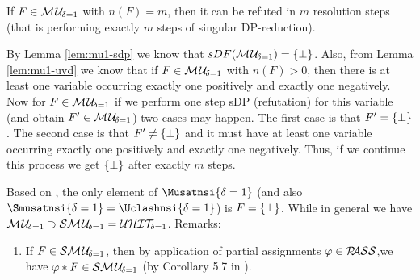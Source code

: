 \documentclass{report}
\begin{document}
\begin{lem}\label{lem:mu1-refu-tree}
If $F \in \mathcal{M\hspace{0.8pt}U}_{\!\delta=1}$ with $n(F)=m$, then it can be refuted in $m$ resolution steps (that is performing exactly $m$ steps of singular DP-reduction).
\end{lem}
\begin{prf}
By Lemma \ref{lem:mu1-sdp} we know that $sDF(\mathcal{M\hspace{0.8pt}U}_{\!\delta=1})=\{ \bot \}$. Also, from Lemma \ref{lem:mu1-uvd} we know that if $F \in \mathcal{M\hspace{0.8pt}U}_{\!\delta=1}$ with $n(F) > 0$, then there is at least one variable occurring exactly one positively and exactly one negatively. Now for $F \in \mathcal{M\hspace{0.8pt}U}_{\!\delta=1}$ if we perform one step sDP (refutation) for this variable (and obtain $F' \in \mathcal{M\hspace{0.8pt}U}_{\!\delta=1}$) two cases may happen. The first case is that $F' =\{ \bot \}$. The second case is that $F' \not = \{ \bot \}$ and it must have at least one variable occurring exactly one positively and exactly one negatively. Thus, if we continue this process we get $\{ \bot \}$ after exactly $m$ steps. 
\end{prf}

\begin{lem}\label{lem:mu1-sma-uhit}
Based on \cite{KullmannZhao2010Extremal}, the only element of $\Musatnsi{\delta=1}$ (and also $\Smusatnsi{\delta=1} = \Uclashnsi{\delta=1}$) is $F=\{ \bot \}$. While in general we have $\mathcal{M\hspace{0.8pt}U}_{\!\delta=1} \supset \mathcal{S}\mathcal{M\hspace{0.8pt}U}_{\!\delta=1} = \mathcal{U}\mathcal{HIT}_{\!\!\delta=1}$.
Remarks:
  \begin{enumerate}
  \item If $F \in \mathcal{S}\mathcal{M\hspace{0.8pt}U}_{\!\delta=1}$, then by application of partial assignments $\varphi \in \mathcal{P\hspace{-0.32em}ASS}$,we have $\varphi * F \in \mathcal{S}\mathcal{M\hspace{0.8pt}U}_{\!\delta=1}$ (by Corollary 5.7 in \cite{GwynneKullmann2013GoodRepresentations}).
  \end{enumerate} 
\end{lem}
\end{document}

